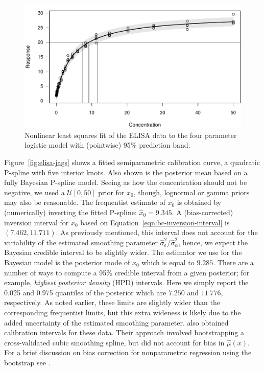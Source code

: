 \documentclass[cmfont,usenames,dvipsnames,leqno]{afit-etd}\usepackage[]{graphicx}\usepackage[]{color}
\makeatletter
\def\maxwidth{ %
  \ifdim\Gin@nat@width>\linewidth
    \linewidth
  \else
    \Gin@nat@width
  \fi
}
\newenvironment{knitrout}{}{} %
\renewenvironment{knitrout}{\begin{singlespace}}{\end{singlespace}}
\newcommand{\mc}[1]{\ensuremath{\mathcal{#1}}}
\newcommand{\wh}[1]{\ensuremath{\widehat{#1}}}
\makeatother
\begin{document}
\begin{knitrout}
\color{fgcolor}\begin{figure}[H]

\includegraphics[width=\maxwidth]{figure/elisa-nls} \caption[Four parameter logistic model for the ELISA data]{Nonlinear least squares fit of the ELISA data to the four parameter logistic model with (pointwise) 95\% prediction band.\label{fig:elisa-nls}}
\end{figure}


\end{knitrout}


Figure~\ref{fig:elisa-jags} shows a fitted semiparametric calibration curve, a quadratic P-spline with five interior knots. Also shown is the posterior mean based on a fully Bayesian P-spline model. Seeing as how the concentration should not be negative, we used a $\mc{U}[0, 50]$ prior for $x_0$, though, lognormal or gamma priors may also be reasonable. The frequentist estimate of $x_0$ is obtained by (numerically) inverting the fitted P-spline: $\wh{x}_0 = 9.345$. A (bias-corrected) inversion interval for $x_0$ based on Equation~\eqref{eqn:bc-inversion-interval} is $(7.462, 11.711)$. As previously mentioned, this interval does not account for the variability of the estimated smoothing parameter $\wh{\sigma}_\epsilon^2/\wh{\sigma}_\alpha^2$, hence, we expect the Bayesian credible interval to be slightly wider. The estimator we use for the Bayesian model is the posterior mode of $x_0$ which is equal to $9.285$. There are a number of ways to compute a 95\% credible interval from a given posterior; for example, \textit{highest posterior density} (HPD) intervals. Here we simply report the 0.025 and 0.975 quantiles of the posterior which are $7.250$ and $11.776$, respectively. As noted earlier, these limits are slightly wider than the corresponding frequentist limits, but this extra wideness is likely due to the added uncertainty of the estimated smoothing parameter. \citet{ori_constructing_1995} also obtained calibration intervals for these data. Their approach involved bootstrapping a cross-validated cubic smoothing spline, but did not account for bias in $\wh{\mu}(x)$. For a brief discussion on bias correction for nonparametric regression using the bootstrap see \citet[pp. 362-366]{davison_bootstrap_1997}.
\end{document}
